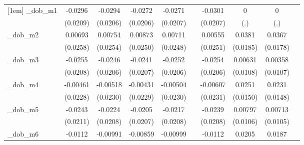 \begin{table}[htbp]
\begin{tabular}{l*{9}{c}}
[1em]
\_dob\_m1     &     -0.0296         &     -0.0294         &     -0.0272         &     -0.0271         &                     &     -0.0301         &           0         &           0         &                     \\
            &    (0.0209)         &    (0.0206)         &    (0.0206)         &    (0.0207)         &                     &    (0.0207)         &         (.)         &         (.)         &                     \\
[1em]
\_dob\_m2     &     0.00693         &     0.00754         &     0.00873         &     0.00711         &                     &     0.00555         &      0.0381\sym{**} &      0.0367\sym{**} &                     \\
            &    (0.0258)         &    (0.0254)         &    (0.0250)         &    (0.0248)         &                     &    (0.0251)         &    (0.0185)         &    (0.0178)         &                     \\
[1em]
\_dob\_m3     &     -0.0255         &     -0.0246         &     -0.0241         &     -0.0252         &                     &     -0.0254         &     0.00631         &     0.00358         &                     \\
            &    (0.0208)         &    (0.0206)         &    (0.0207)         &    (0.0206)         &                     &    (0.0206)         &    (0.0108)         &    (0.0107)         &                     \\
[1em]
\_dob\_m4     &    -0.00461         &    -0.00518         &    -0.00431         &    -0.00504         &                     &    -0.00607         &      0.0251\sym{*}  &      0.0231         &                     \\
            &    (0.0228)         &    (0.0230)         &    (0.0229)         &    (0.0230)         &                     &    (0.0231)         &    (0.0150)         &    (0.0148)         &                     \\
[1em]
\_dob\_m5     &     -0.0243         &     -0.0224         &     -0.0205         &     -0.0217         &                     &     -0.0239         &     0.00797         &     0.00713         &                     \\
            &    (0.0211)         &    (0.0208)         &    (0.0207)         &    (0.0208)         &                     &    (0.0208)         &    (0.0106)         &    (0.0105)         &                     \\
[1em]
\_dob\_m6     &     -0.0112         &    -0.00991         &    -0.00859         &    -0.00999         &                     &     -0.0112         &      0.0205         &      0.0187         &                     \\

\end{tabular}
\end{table}
